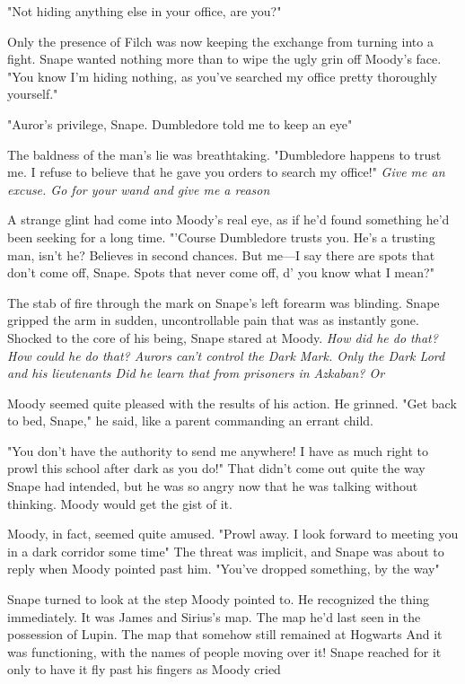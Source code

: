"Not hiding anything else in your office, are you?"

Only the presence of Filch was now keeping the exchange from turning into a fight. Snape wanted nothing more than to wipe the ugly grin off Moody's face. "You know I'm hiding nothing, as you've searched my office pretty thoroughly yourself."

"Auror's privilege, Snape. Dumbledore told me to keep an eye{\el}"

The baldness of the man's lie was breathtaking. "Dumbledore happens to trust me. I refuse to believe that he gave you orders to search my office!" \emph{Give me an excuse. Go for your wand and give me a reason{\el}}

A strange glint had come into Moody's real eye, as if he'd found something he'd been seeking for a long time. "'Course Dumbledore trusts you. He's a trusting man, isn't he? Believes in second chances. But me—I say there are spots that don't come off, Snape. Spots that never come off, d' you know what I mean?"

The stab of fire through the mark on Snape's left forearm was blinding. Snape gripped the arm in sudden, uncontrollable pain that was as instantly gone. Shocked to the core of his being, Snape stared at Moody. \emph{How did he do that? How could he do that? Aurors can't control the Dark Mark. Only the Dark Lord and his lieutenants{\el} Did he learn that from prisoners in Azkaban? Or{\el}}

Moody seemed quite pleased with the results of his action. He grinned. "Get back to bed, Snape," he said, like a parent commanding an errant child.

"You don't have the authority to send me anywhere! I have as much right to prowl this school after dark as you do!" That didn't come out quite the way Snape had intended, but he was so angry now that he was talking without thinking. Moody would get the gist of it.

Moody, in fact, seemed quite amused. "Prowl away. I look forward to meeting you in a dark corridor some time{\el}" The threat was implicit, and Snape was about to reply when Moody pointed past him. "You've dropped something, by the way{\el}"

Snape turned to look at the step Moody pointed to. He recognized the thing immediately. It was James and Sirius's map. The map he'd last seen in the possession of Lupin. The map that somehow still remained at Hogwarts{\el} And it was functioning, with the names of people moving over it! Snape reached for it only to have it fly past his fingers as Moody cried{\el}

